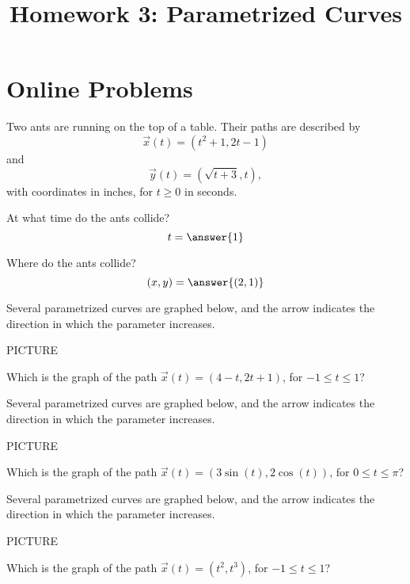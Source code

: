 \documentclass{ximera}
\title{Homework 3: Parametrized Curves}
\begin{document}
\begin{abstract}
\end{abstract}
\maketitle
\section*{Online Problems}
\begin{problem}
Two ants are running on the top of a table. Their paths are described by
\[
\vec{x}(t) = (t^2+1,2t-1)
\]
and
\[
\vec{y}(t) = (\sqrt{t+3}, t),
\]
with coordinates in inches, for $t\geq 0$ in seconds.

At what time do the ants collide?
\[
t = \answer{1}
\]

Where do the ants collide?
\[
(x,y) = \answer{(2,1)}
\]

\end{problem}

\begin{problem}
Several parametrized curves are graphed below, and the arrow indicates the direction in which the parameter increases.

PICTURE

Which is the graph of the path $\vec{x}(t) = (4-t, 2t+1)$, for $-1\leq t\leq 1$?
\begin{multipleChoice}
\end{multipleChoice}
\end{problem}

\begin{problem}
Several parametrized curves are graphed below, and the arrow indicates the direction in which the parameter increases.

PICTURE

Which is the graph of the path $\vec{x}(t) = (3\sin(t), 2\cos(t))$, for $0\leq t\leq \pi$?
\begin{multipleChoice}
\end{multipleChoice}
\end{problem}

\begin{problem}
Several parametrized curves are graphed below, and the arrow indicates the direction in which the parameter increases.

PICTURE

Which is the graph of the path $\vec{x}(t) = (t^2, t^3)$, for $-1\leq t\leq 1$?
\begin{multipleChoice}
\end{multipleChoice}
\end{problem}
\end{document}
